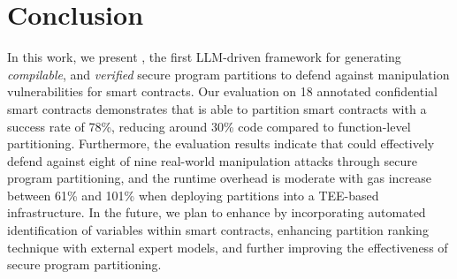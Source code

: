 \section{Conclusion}
\label{sec:conclude}
In this work, we present \tool, the first LLM-driven framework for generating \emph{compilable}, and \emph{verified} secure program partitions to defend against manipulation vulnerabilities for smart contracts. Our evaluation on 18 annotated confidential smart contracts demonstrates that \tool is able to partition smart contracts with a success rate of 78\%, reducing around 30\% code compared to function-level partitioning. Furthermore, the evaluation results indicate that \tool could effectively defend against eight of nine real-world manipulation attacks through secure program partitioning, and the runtime overhead is moderate with gas increase between 61\% and 101\% when deploying partitions into a TEE-based infrastructure.
In the future, we plan to enhance \tool by incorporating automated identification of \secrete variables within smart contracts, enhancing partition ranking technique with external expert models, and further improving the effectiveness of secure program partitioning.